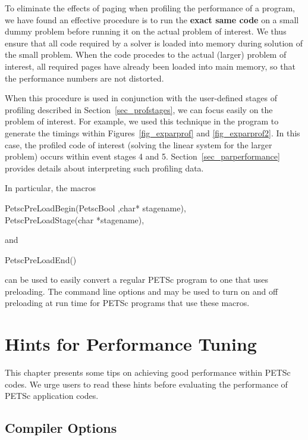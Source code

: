 {{To eliminate the effects of paging when profiling the performance of a
program, we have found an effective procedure is to run the {\bf exact same
code} on a small dummy problem before running it on the actual problem
of interest. We thus ensure that all code required by a solver is
loaded into memory during solution of the small problem.  When the
code procedes to the actual (larger) problem of interest, all required
pages have already been loaded into main memory, so that the
performance numbers are not distorted.

When this procedure is used in conjunction with the user-defined stages of profiling
described in Section~\ref{sec_profstages}, we can focus easily on the
problem of interest.  For example, we used this technique in the program
 to
generate the timings within Figures~\ref{fig_exparprof} and \ref{fig_exparprof2}.
In this case,
the profiled code of interest (solving the linear system for the larger problem)
occurs within event stages 4 and 5.  Section~\ref{sec_parperformance} provides
details about interpreting such profiling data.

In particular, the macros
\begin{tabbing}
  PetscPreLoadBegin(PetscBool ,char* stagename),\\
  PetscPreLoadStage(char *stagename),
\end{tabbing}
and
\begin{tabbing}
  PetscPreLoadEnd()
\end{tabbing}
can be used to easily
convert a regular PETSc program to one that uses preloading. The command line options
  and   may be used to turn on and off
preloading at run time for PETSc programs that use these macros. 

\cleardoublepage
\chapter{Hints for Performance Tuning}
\label{ch_performance} \hypertarget{ch_performance}{}

This chapter presents some tips on achieving good performance within
PETSc codes.  We urge users to read these hints before
evaluating the performance of PETSc application codes.

\section{Compiler Options}


}}
